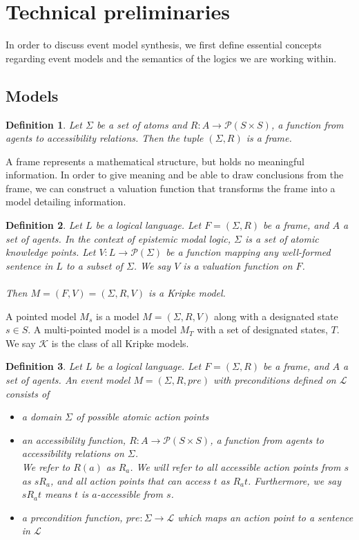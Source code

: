\documentclass[12pt, a4paper, titlepage]{scrartcl}
\newtheorem{defn}{Definition}[section]
\numberwithin{equation}{section}
\newcommand{\kripkeClass}{\mathcal{K}}
\begin{document}
\tableofcontents

\pagebreak

\section{Technical preliminaries}
In order to discuss event model synthesis, we first define essential concepts regarding event
models and the semantics of the logics we are working within.

\subsection{Models}

\begin{defn} \label{frame}
	Let $\Sigma$ be a set of atoms and $R: A \to \mathcal{P}(S \times S)$, a function from agents to
	accessibility relations.
	Then the tuple $(\Sigma, R)$ is a frame.
\end{defn}

A frame represents a mathematical structure, but holds no meaningful information.
In order to give meaning and be able to draw conclusions from the frame, we can
construct a valuation function that transforms the frame into a model detailing
information.
\begin{defn} \label{model}
	Let $L$ be a logical language.
	Let $F = (\Sigma, R)$ be a frame, and $A$ a set of agents.
	In the context of epistemic modal logic, $\Sigma$ is a set of atomic knowledge points.
	Let $V: L \to \mathcal{P}(\Sigma)$ be a function mapping any
	well-formed	sentence in $L$ to a subset of $\Sigma$.
	We say $V$ is a valuation function on $F$.\\
	\\
	Then $M = (F, V) = (\Sigma, R, V)$ is a Kripke
	model.
\end{defn}
A pointed model $M_s$ is a model $M = (\Sigma, R, V)$ along with a designated state $s \in S$.
A multi-pointed model is a model $M_T$ with a set of designated states, $T$.
We say $\kripkeClass$ is the class of all Kripke models.

\begin{defn} \label{evModel}
	Let $L$ be a logical language.
	Let $F = (\Sigma, R)$ be a frame, and $A$ a set of agents.
	An event model $M = (\Sigma, R, pre)$ with preconditions defined on $\mathcal{L}$ consists of
	\begin{itemize}
		\item a domain $\Sigma$ of possible atomic action points
		\item an accessibility function, $R: A \to \mathcal{P}(S \times S)$, a function from agents to
		accessibility relations on $\Sigma$.\\
		We refer to $R(a)$ as $R_a$.
		We will refer to all accessible action points from $s$ as $s R_a$, and all action points that
		can access $t$ as $R_a t$.
		Furthermore, we say $s R_a t$ means $t$ is $a$-accessible from $s$.
		\item a precondition function, $pre: \Sigma \to \mathcal{L}$ which maps an action point to a
		sentence in $\mathcal{L}$
	\end{itemize}
\end{defn}
\end{document}

